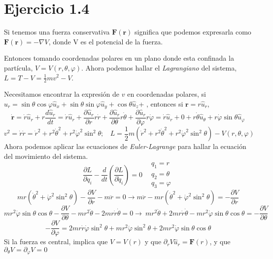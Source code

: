
\section{Ejercicio 1.4}


Si tenemos una fuerza conservativa $\mathbf{F}(\mathbf{r})$ significa que podemos expresarla como $\mathbf{F}(\mathbf{r})=-\nabla V$, donde V es el potencial de la fuerza.

Entonces tomando coordenadas polares en un plano donde esta confinada la partícula, $V=V(r,\theta,\varphi)$. Ahora podemos hallar el \textit{Lagrangiano} del sistema, $L = T-V=\frac{1}{2}mv^2-V$.

Necesitamos encontrar la expresión de $v$ en coordenadas polares, si $\hat{u}_r=\sin{\theta}\cos{\varphi} \hat{u}_x + \sin{\theta}\sin{\varphi} \hat{u}_y + \cos{\theta} \hat{u}_z$+ , entonces si $\mathbf{r}=r \hat{u}_r$, 
\[\dot{\mathbf{r}}=\dot{r} \hat{u}_r + r \frac{d \hat{u}_r}{dt}=\dot{r} \hat{u}_r + \frac{\partial \hat{u}_r}{\partial r} r\dot{r} + \frac{\partial \hat{u}_r}{\partial \theta} r\dot{\theta} + \frac{\partial \hat{u}_r}{\partial \varphi} r\dot{\varphi}=\dot{r} \hat{u}_r+0 + r\dot{\theta} \hat{u}_{\theta} + r\dot{\varphi}\sin{\theta} \hat{u}_{\varphi}\]
\[v^2=\dot{r}\dot{r}={\dot{r}}^2+r^2{\dot{\theta}}^2 + r^2{\dot{\varphi}^2\sin^2{\theta}}; \ \ \ \ L = \frac{1}{2}m({\dot{r}}^2+r^2{\dot{\theta}}^2 + r^2{\dot{\varphi}^2\sin^2{\theta}})-V(r,\theta,\varphi)\]
Ahora podemos aplicar las ecuaciones de \textit{Euler-Lagrange} para hallar la ecuación del movimiento del sistema.
\[\frac{\partial L}{\partial q_i}-\frac{d}{dt}\left(\frac{\partial L}{\partial \dot{q}_i}\right)=0 \ \ \ \ \begin{matrix}
    q_1= r \\ q_2 = \theta \\ q_3 = \varphi
\end{matrix}\]
\[mr(\dot{\theta}^2+\dot{\varphi}^2\sin^2{\theta})-\frac{\partial V}{\partial r}-m\ddot{r}=0 \rightarrow m\ddot{r}- mr(\dot{\theta}^2+\dot{\varphi}^2\sin^2{\theta})=-\frac{\partial V}{\partial r}\]
\[m r^2 \dot{\varphi} \sin{\theta} \cos{\theta} - \frac{\partial V}{\partial \theta }- mr^2\ddot{\theta}-2mr\dot{r}\dot{\theta}=0 \rightarrow\ mr^2\ddot{\theta}+2mr\dot{r}\dot{\theta}-m r^2 \dot{\varphi} \sin{\theta} \cos{\theta} = - \frac{\partial V}{\partial \theta }\]
\[- \frac{\partial V}{\partial \varphi } = 2 m r \dot{r} \dot{\varphi} \sin^2{\theta}+ m r^2 \ddot{\varphi} \sin^2{\theta}+2mr^2 \dot{\varphi} \sin{\theta} \cos{\theta}\]
Si la fuerza es central, implica que $V=V(r)$ y que $\partial_r V \hat{u}_r= \mathbf{F}(r)$, y que $\partial_{\theta} V = \partial_{\varphi} V = 0$

